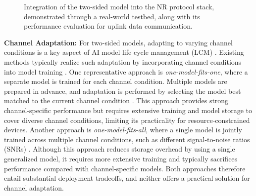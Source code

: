 \documentclass[10pt,twocolumn]{IEEEtran}
\begin{document}
\begin{figure}[t]
    \centering
    {}\vspace{-2mm}
    \caption{Integration of the two-sided model into the NR protocol stack, demonstrated through a real-world testbed, along with its performance evaluation for uplink data communication.}\label{fig:arc}\vspace{-3mm}
\end{figure}




\vspace{1mm}
{\bf Channel Adaptation:} 
For two-sided models, adapting to varying channel conditions is a key aspect of AI model life cycle management (LCM) \cite{3gpp_tr38843_rel19}. Existing methods typically realize such adaptation by incorporating channel conditions into model training \cite{DeepJSCC_Q,10015684}. 
One representative approach is \emph{one-model-fits-one}, where a separate model is trained for each channel condition. Multiple models are prepared in advance, and adaptation is performed by selecting the model best matched to the current channel condition \cite{DeepJSCC_Q}. This approach provides strong channel-specific performance but requires extensive training and model storage to cover diverse channel conditions, limiting its practicality for resource-constrained devices. Another approach is \emph{one-model-fits-all}, where a single model is jointly trained across multiple channel conditions, such as different signal-to-noise ratios (SNRs) \cite{10015684}. Although this approach reduces storage overhead by using a single generalized model, it requires more extensive training and typically sacrifices performance compared with channel-specific models. Both approaches therefore entail substantial deployment tradeoffs, and neither offers a practical solution for channel adaptation.


\end{document}
